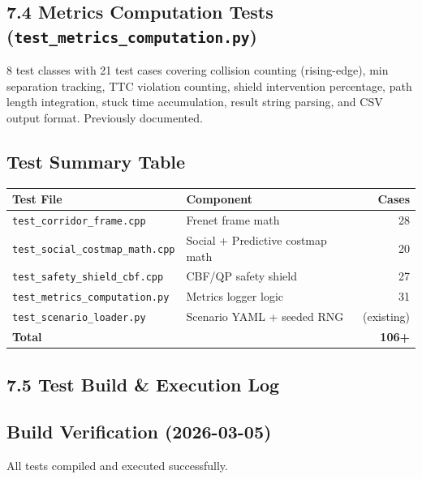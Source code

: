 \documentclass[11pt]{article}
\newcommand{\logentry}[1]{\subsection*{#1}}
\begin{document}

\subsection*{7.4 Metrics Computation Tests (\texttt{test\_metrics\_computation.py})}

8 test classes with 21 test cases covering collision counting (rising-edge),
min separation tracking, TTC violation counting, shield intervention percentage,
path length integration, stuck time accumulation, result string parsing, and
CSV output format. Previously documented.

\subsection*{Test Summary Table}

\begin{center}
\begin{tabular}{llr}
\textbf{Test File} & \textbf{Component} & \textbf{Cases} \\
\hline
\texttt{test\_corridor\_frame.cpp} & Frenet frame math & 28 \\
\texttt{test\_social\_costmap\_math.cpp} & Social + Predictive costmap math & 20 \\
\texttt{test\_safety\_shield\_cbf.cpp} & CBF/QP safety shield & 27 \\
\texttt{test\_metrics\_computation.py} & Metrics logger logic & 31 \\
\texttt{test\_scenario\_loader.py} & Scenario YAML + seeded RNG & (existing) \\
\hline
\textbf{Total} & & \textbf{106+} \\
\end{tabular}
\end{center}

\subsection*{7.5 Test Build \& Execution Log}

\logentry{Build Verification (2026-03-05)}
All tests compiled and executed successfully.
\end{document}
